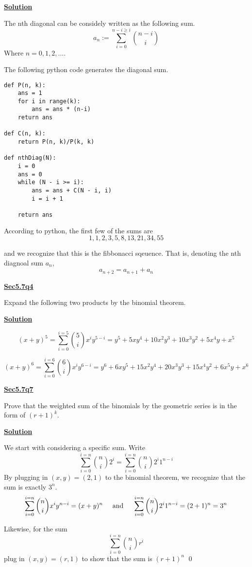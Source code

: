 \documentclass{article}
\newcommand{\new}[1]{
    \vspace{2mm}
    \noindent
    \textbf{
    \underline{#1}}
}
\newcommand{\textAnd}{
    {
        \hspace{5mm}
        \textrm{and}
        \hspace{5mm}
    }
}
\begin{document}
\new{Solution}

The nth diagonal can be considely written as the following sum. 
\[
    a_n := \sum_{i = 0} ^ {n-i\geq i} 
    \binom{n - i}{i}
\]
Where $n  = 0, 1, 2, ...$. 

The following python code generates the diagonal sum. 

\begin{verbatim}
def P(n, k):
    ans = 1
    for i in range(k):
        ans = ans * (n-i)
    return ans

def C(n, k):
    return P(n, k)/P(k, k)

def nthDiag(N):
    i = 0
    ans = 0
    while (N - i >= i):
        ans = ans + C(N - i, i)
        i = i + 1
        
    return ans
\end{verbatim}

According to python, the first few of the sums are
\[
    1, 1, 2, 3, 5, 8, 13, 21, 34, 55
\]

and we recognize that this is the fibbonacci sqeuence. 
That is, denoting the nth diagnoal sum $a_n$, 
\[
    a_{n+2} = a_{n+1}+a_{n}
\]


\new{Sec5.7q4}
Expand the following two products by the binomial theorem. 


\newcommand{\term}[2]{
    x^{#1}y^{#2}
}


\new{Solution}

\[
    (x + y)^5 = 
    \sum_{i = 0}^{i = 5} \binom{5}{i} \term{i}{5 - i}
    = y^5 + 5 x y^4 + 10 x^2 y^3 + 10 x^3 y^2 + 5 x^4 y + x^5
\]

\[
    (x + y)^6 = 
    \sum_{i = 0}^{i = 6} \binom{6}{i} \term{i}{6 - i}
    = y^6 + 6 x y^5 + 15 x^2 y^4 + 20 x^3 y^3 + 15 x^4 y^2 + 6 x^5 y + x^6
\]

\new{Sec5.7q7}
Prove that the weighted sum of the binomials by the geometric 
series is in the form of $(r+1)^k$. 

\new{Solution}
We start with considering a specific sum. Write 
\[
    \sum_{i = 0}^{i = n} \binom{n}{i} 2^i 
    = 
    \sum_{i = 0}^{i = n} \binom{n}{i} 2^i 1^{n - i} 
\]
By plugging in $(x, y) = (2, 1)$ to the binomial theorem, 
we recognize that the sum is exactly $3^n$. 
\[
    \sum_{i = 0}^{i = n} \binom{n}{i} x^iy^{n-i} = (x+y)^n
    \textAnd 
    \sum_{i = 0}^{i = n} \binom{n}{i} 2^i 1^{n - i} = (2+1)^n = 3^n
\]

Likewise, for the sum 
\[
    \sum_{i = 0}^{i = n} \binom{n}{i} r^i 
\]
plug in $(x, y) = (r, 1)$ to show that the sum is $(r + 1)^n$
\hfill \qed
\end{document}
